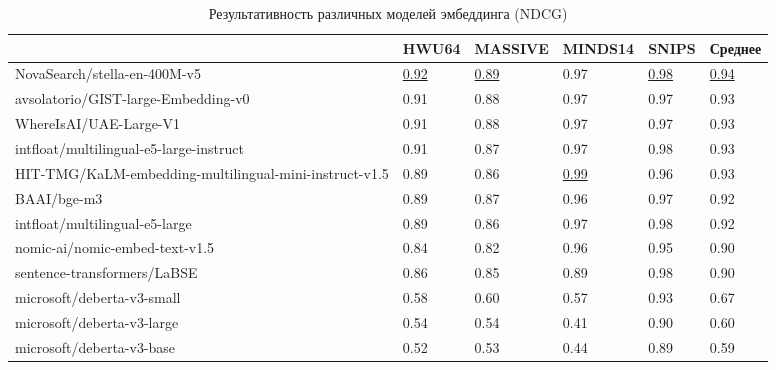\documentclass[14pt,a4paper,oneside,openany]{extbook}
\begin{document}
\begin{table}[h!]
\caption{\label{tbl:embedding_models_ndcg}Результативность различных моделей эмбеддинга (NDCG)}
\centering
\begin{tabular}{|p{5cm}|p{2cm}|p{2cm}|p{2cm}|p{2cm}|p{2cm}|}
\hline
 & HWU64 & MASSIVE & MINDS14 & SNIPS & Среднее\\
\hline
NovaSearch/stella-en-400M-v5 & \uline{0.92} & \uline{0.89} & 0.97 & \uline{0.98} & \uline{0.94}\\
\hline
avsolatorio/GIST-large-Embedding-v0 & 0.91 & 0.88 & 0.97 & 0.97 & 0.93\\
\hline
WhereIsAI/UAE-Large-V1 & 0.91 & 0.88 & 0.97 & 0.97 & 0.93\\
\hline
intfloat/multilingual-e5-large-instruct & 0.91 & 0.87 & 0.97 & 0.98 & 0.93\\
\hline
HIT-TMG/KaLM-embedding-multilingual-mini-instruct-v1.5 & 0.89 & 0.86 & \uline{0.99} & 0.96 & 0.93\\
\hline
BAAI/bge-m3 & 0.89 & 0.87 & 0.96 & 0.97 & 0.92\\
\hline
intfloat/multilingual-e5-large & 0.89 & 0.86 & 0.97 & 0.98 & 0.92\\
\hline
nomic-ai/nomic-embed-text-v1.5 & 0.84 & 0.82 & 0.96 & 0.95 & 0.90\\
\hline
sentence-transformers/LaBSE & 0.86 & 0.85 & 0.89 & 0.98 & 0.90\\
\hline
microsoft/deberta-v3-small & 0.58 & 0.60 & 0.57 & 0.93 & 0.67\\
\hline
microsoft/deberta-v3-large & 0.54 & 0.54 & 0.41 & 0.90 & 0.60\\
\hline
microsoft/deberta-v3-base & 0.52 & 0.53 & 0.44 & 0.89 & 0.59\\
\hline
\end{tabular}
\end{table}
\end{document}
